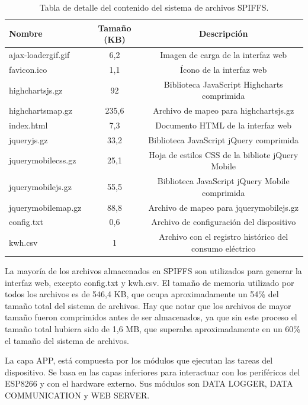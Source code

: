\begin{table}[h]
	\centering
	\caption[Contenido SPIFFS]{Tabla de detalle del contenido del sistema de archivos SPIFFS.}
	\begin{tabular}{l c c}    
		\toprule
		\textbf{Nombre} & \textbf{Tamaño (KB)} & \textbf{Descripción} \\
		\midrule
		ajax-loadergif.gif & 6,2 & Imagen de carga de la interfaz web \\
		favicon.ico & 1,1 & Ícono de la interfaz web\\
		highchartsjs.gz	& 92 & Biblioteca JavaScript Highcharts comprimida \\
		highchartsmap.gz & 235,6 & Archivo de mapeo para highchartsjs.gz \\
		index.html & 7,3 & Documento HTML de la interfaz web \\
		jqueryjs.gz & 33,2 & Biblioteca JavaScript jQuery comprimida \\
		jquerymobilecss.gz & 25,1 & Hoja de estilos CSS de la bibliote jQuery Mobile \\
		jquerymobilejs.gz & 55,5 & Biblioteca JavaScript jQuery Mobile comprimida \\
		jquerymobilemap.gz & 88,8 & Archivo de mapeo para jquerymobilejs.gz \\
		config.txt & 0,6 & Archivo de configuración del dispositivo \\
		kwh.csv & 1 & Archivo con el registro histórico del consumo eléctrico \\
		
		\bottomrule
		\hline
	\end{tabular}
	\label{tab:spiffsDetail}
\end{table}

La mayoría de los archivos almacenados en SPIFFS son utilizados para generar la interfaz web, excepto config.txt y kwh.csv. El tamaño de memoria utilizado por todos los archivos es de 546,4 KB, que ocupa aproximadamente un 54\% del tamaño total del sistema de archivos. Hay que notar que los archivos de mayor tamaño fueron comprimidos antes de ser almacenados, ya que sin este proceso el tamaño total hubiera sido de 1,6 MB, que superaba aproximadamente en un 60\% el tamaño del sistema de archivos.

La capa APP, está compuesta por los módulos que ejecutan las tareas del dispositivo. Se basa en las capas inferiores para interactuar con los periféricos del ESP8266 y con el hardware externo. Sus módulos son DATA LOGGER, DATA COMMUNICATION y WEB SERVER.

